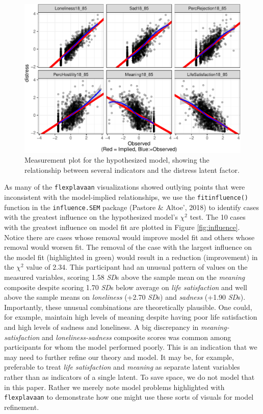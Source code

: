 \documentclass[
  english,
  man]{apa6}
\begin{document}
\begin{figure}

{\centering \includegraphics[width=0.8\linewidth]{flexplavaan_draft_files/figure-latex/measurementrealdistress-1} 

}

\caption{Measurement plot for the hypothesized model, showing the relationship between several indicators and the distress latent factor.}\label{fig:measurementrealdistress}
\end{figure}

As many of the \texttt{flexplavaan} visualizations showed outlying points that were inconsistent with the model-implied relationships, we use the \texttt{fitinfluence()} function in the \texttt{influence.SEM} package (Pastore \& Altoe', 2018) to identify cases with the greatest influence on the hypothesized model's \(\chi^2\) test. The 10 cases with the greatest influence on model fit are plotted in Figure \ref{fig:influence}. Notice there are cases whose removal would improve model fit and others whose removal would worsen fit. The removal of the case with the largest influence on the model fit (highlighted in green) would result in a reduction (improvement) in the \(\chi^2\) value of 2.34. This participant had an unusual pattern of values on the measured variables, scoring 1.58 \emph{SD}s above the sample mean on the \emph{meaning} composite despite scoring 1.70 \emph{SD}s below average on \emph{life satisfaction} and well above the sample means on \emph{loneliness} (+2.70 \emph{SD}s) and \emph{sadness} (+1.90 \emph{SD}s). Importantly, these unusual combinations are theoretically plausible. One could, for example, maintain high levels of meaning despite having poor life satisfaction and high levels of sadness and loneliness. A big discrepancy in \emph{meaning-satisfaction} and \emph{loneliness-sadness} composite scores was common among participants for whom the model performed poorly. This is an indication that we may need to further refine our theory and model. It may be, for example, preferable to treat \emph{life satisfaction} and \emph{meaning} as separate latent variables rather than as indicators of a single latent. To save space, we do not model that in this paper. Rather we merely note model problems highlighted with \texttt{flexplavaan} to demonstrate how one might use these sorts of visuals for model refinement.
\end{document}
